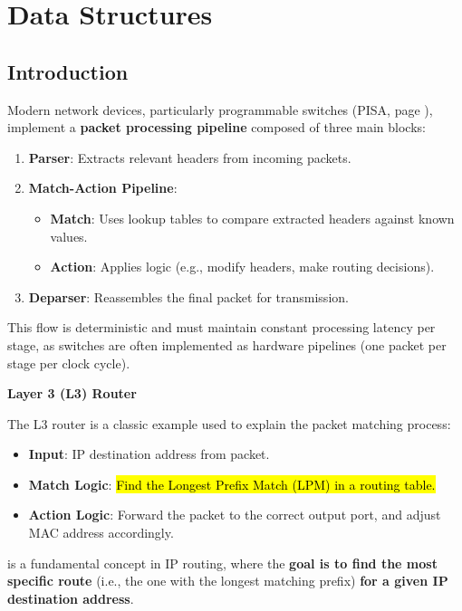 \section{Data Structures}

\subsection{Introduction}

Modern network devices, particularly programmable switches (PISA, page \pageref{subsection: PISA and Compiler Pipeline Mapping}), implement a \textbf{packet processing pipeline} composed of three main blocks:
\begin{enumerate}
    \item \textbf{Parser}: Extracts relevant headers from incoming packets.
    \item \textbf{Match-Action Pipeline}:
    \begin{itemize}
        \item \textbf{Match}: Uses lookup tables to compare extracted headers against known values.
        \item \textbf{Action}: Applies logic (e.g., modify headers, make routing decisions).
    \end{itemize}
    \item \textbf{Deparser}: Reassembles the final packet for transmission.
\end{enumerate}
This flow is deterministic and must maintain constant processing latency per stage, as switches are often implemented as hardware pipelines (one packet per stage per clock cycle).

\highspace
\begin{flushleft}
    \textcolor{Green3}{ \textbf{Layer 3 (L3) Router}}
\end{flushleft}
The L3 router is a classic example used to explain the packet matching process:
\begin{itemize}
    \item \textbf{Input}: IP destination address from packet.
    \item \textbf{Match Logic}: \hl{Find the Longest Prefix Match (LPM) in a routing table.}
    \item \textbf{Action Logic}: Forward the packet to the correct output port, and adjust MAC address accordingly.
\end{itemize}
 is a fundamental concept in IP routing, where the \textbf{goal is to find the most specific route} (i.e., the one with the longest matching prefix) \textbf{for a given IP destination address}.

